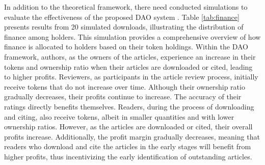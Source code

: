 \documentclass[lettersize,journal]{IEEEtran}
\begin{document}
In addition to the theoretical framework, there need conducted simulations to evaluate the effectiveness of the proposed DAO system \cite{macal2009agent}. Table \ref{tab:finance} presents results from 20 simulated downloads, illustrating the distribution of finance among holders. This simulation provides a comprehensive overview of how finance is allocated to holders based on their token holdings.
Within the DAO framework, authors, as the owners of the articles, experience an increase in their tokens and ownership ratio when their articles are downloaded or cited, leading to higher profits. Reviewers, as participants in the article review process, initially receive tokens that do not increase over time. Although their ownership ratio gradually decreases, their profits continue to increase. The accuracy of their ratings directly benefits themselves. Readers, during the process of downloading and citing, also receive tokens, albeit in smaller quantities and with lower ownership ratios. However, as the articles are downloaded or cited, their overall profits increase. Additionally, the profit margin gradually decreases, meaning that readers who download and cite the articles in the early stages will benefit from higher profits, thus incentivizing the early identification of outstanding articles.
\end{document}
